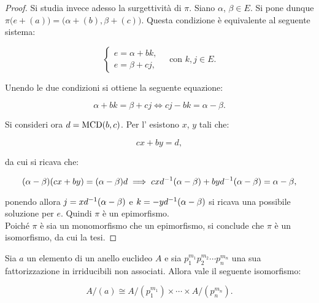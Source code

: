 \documentclass[11pt]{scrbook}
\begin{document}
\begin{proof}
        Si studia invece adesso la surgettività di $\pi$. Siano $\alpha$,
        $\beta \in E$. Si pone dunque $\pi\bigl(e + (a)\bigr) =
        \bigl(\alpha + (b), \beta + (c)\bigr)$. Questa condizione è equivalente
        al seguente sistema:
        
        \[ \begin{cases} e = \alpha + bk, \\ e = \beta + cj, \end{cases} \quad \text{con } k, j \in E. \]
        
        \vskip 0.1in
        
        Unendo le due condizioni si ottiene la seguente equazione:
        
        \[ \alpha + bk = \beta + cj \iff cj - bk = \alpha - \beta.  \]
        
        \vskip 0.1in
        
        Si consideri ora $d = \operatorname{MCD}(b, c)$. Per l' esistono
        $x$, $y$ tali che:
        
        \[ cx+by=d, \]
        
        \vskip 0.1in
        
        da cui si ricava che:
        
        \[ (\alpha-\beta)(cx + by) = (\alpha-\beta)d \implies cxd^{-1}(\alpha-\beta)+byd^{-1}(\alpha-\beta)=\alpha-\beta, \]
        
        \vskip 0.1in
        
        ponendo allora $j=xd^{-1}(\alpha-\beta)$ e $k=-yd^{-1}(\alpha-\beta)$
        si ricava una possibile soluzione per $e$. Quindi
        $\pi$ è un epimorfismo. \\
        
        Poiché $\pi$ è sia un monomorfismo che un epimorfismo, si conclude
        che $\pi$ è un isomorfismo, da cui la tesi.
        
    \end{proof}

    \begin{theorem}
        \label{th:cinese}
    
        Sia $a$ un elemento di un anello euclideo $A$ e sia
        $p_1^{m_1}p_2^{m_2}\cdots p_n^{m_n}$ una sua fattorizzazione
        in irriducibili non associati.
        Allora vale il seguente isomorfismo:
        
        \[ A/(a) \cong A/(p_1^{m_1}) \times \cdots \times A/(p_n^{m_n}). \]
    \end{theorem}
    
\end{document}
